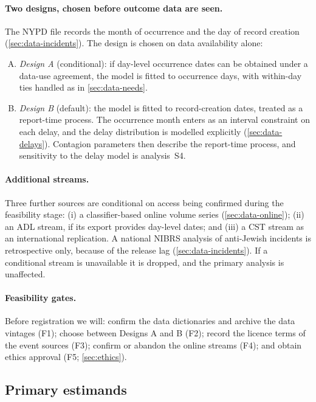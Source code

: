 \paragraph{Two designs, chosen before outcome data are seen.}
The NYPD file records the month of occurrence and the day of record creation
(\cref{sec:data-incidents}). The design is chosen on data availability
alone:
\begin{enumerate}[(A)]
  \item \emph{Design A} (conditional): if day-level occurrence dates can be
  obtained under a data-use agreement, the model is fitted to occurrence
  days, with within-day ties handled as in \cref{sec:data-needs}.
  \item \emph{Design B} (default): the model is fitted to record-creation
  dates, treated as a report-time process. The occurrence month enters as an
  interval constraint on each delay, and the delay distribution is modelled
  explicitly (\cref{sec:data-delays}). Contagion parameters then describe the
  report-time process, and sensitivity to the delay model is analysis~S4.
\end{enumerate}

\paragraph{Additional streams.}
Three further sources are conditional on access being confirmed during the
feasibility stage: (i) a classifier-based online volume series
(\cref{sec:data-online}); (ii) an ADL stream, if its export provides
day-level dates; and (iii) a CST stream as an international replication. A
national NIBRS analysis of anti-Jewish incidents is retrospective only,
because of the release lag (\cref{sec:data-incidents}). If a conditional
stream is unavailable it is dropped, and the primary analysis is unaffected.

\paragraph{Feasibility gates.}
Before registration we will: confirm the data dictionaries and archive the
data vintages (F1); choose between Designs A and B (F2); record the
licence terms of the event sources (F3); confirm or abandon the online
streams (F4); and obtain ethics approval (F5; \cref{sec:ethics}).

\subsection{Primary estimands}\label{sec:plan-estimands}

